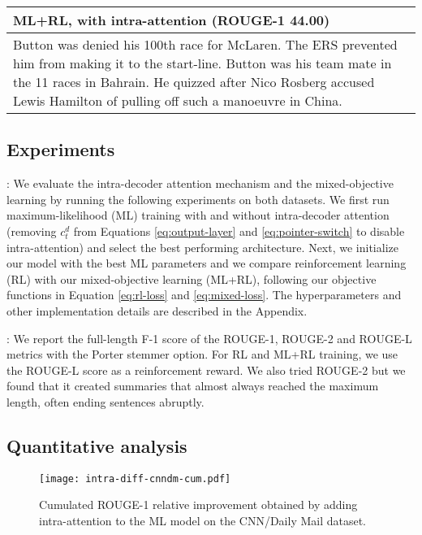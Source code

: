 \documentclass{article} \usepackage{iclr2018_arxiv,times}
\begin{document}
\begin{table*}
\begin{minipage}{\textwidth}
\begin{tabular}{|p{\textwidth}|}
{\bf ML+RL, with intra-attention (ROUGE-1 44.00)}\\\hline
Button was denied his 100th race for McLaren. The ERS prevented him from making it to the start-line. Button was his team mate in the 11 races in Bahrain. He quizzed after Nico Rosberg accused Lewis Hamilton of pulling off such a manoeuvre in China. \\\hline
\end{tabular}

\label{tab:examples}

\end{minipage}
\end{table*}

\subsection{Experiments}

: We evaluate the intra-decoder attention mechanism and the mixed-objective learning by running the following experiments on both datasets. We first run maximum-likelihood (ML) training with and without intra-decoder attention (removing $c^d_t$ from Equations \ref{eq:output-layer} and \ref{eq:pointer-switch} to disable intra-attention) and select the best performing architecture. Next, we initialize our model with the best ML parameters and we compare reinforcement learning (RL) with our mixed-objective learning (ML+RL), following our objective functions in Equation \ref{eq:rl-loss} and \ref{eq:mixed-loss}. The hyperparameters and other implementation details are described in the Appendix.

: We report the full-length F-1 score of the ROUGE-1, ROUGE-2 and ROUGE-L metrics with the Porter stemmer option. For RL and ML+RL training, we use the ROUGE-L score as a reinforcement reward. We also tried ROUGE-2 but we found that it created summaries that almost always reached the maximum length, often ending sentences abruptly.

\subsection{Quantitative analysis}

\begin{wrapfigure}{R}{0.46\textwidth}
	\vspace{-5mm}
    \begin{center}
	\texttt{[image: intra-diff-cnndm-cum.pdf]}
    \end{center}
	\caption{Cumulated ROUGE-1 relative improvement obtained by adding intra-attention to the ML model on the CNN/Daily Mail dataset.}
    \vspace{-5mm}
	\label{fig:intra-diff-rouge}
\end{wrapfigure}
\end{document}
